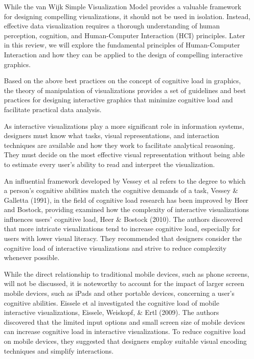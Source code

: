 \documentclass[print]{nuthesis}
\begin{document}
While the van Wijk Simple Visualization Model provides a valuable framework for designing compelling visualizations, it should not be used in isolation.
Instead, effective data visualization requires a thorough understanding of human perception, cognition, and Human-Computer Interaction (HCI) principles.
Later in this review, we will explore the fundamental principles of Human-Computer Interaction and how they can be applied to the design of compelling interactive graphics.

Based on the above best practices on the concept of cognitive load in graphics, the theory of manipulation of visualizations provides a set of guidelines and best practices for designing interactive graphics that minimize cognitive load and facilitate practical data analysis.

As interactive visualizations play a more significant role in information systems, designers must know what tasks, visual representations, and interaction techniques are available and how they work to facilitate analytical reasoning.
They must decide on the most effective visual representation without being able to estimate every user's ability to read and interpret the visualization.

An influential framework developed by Vessey et al refers to the degree to which a person's cognitive abilities match the cognitive demands of a task, Vessey \& Galletta (1991), in the field of cognitive load research has been improved by Heer and Bostock, providing examined how the complexity of interactive visualizations influences users' cognitive load, Heer \& Bostock (2010).
The authors discovered that more intricate visualizations tend to increase cognitive load, especially for users with lower visual literacy.
They recommended that designers consider the cognitive load of interactive visualizations and strive to reduce complexity whenever possible.

While the direct relationship to traditional mobile devices, such as phone screens, will not be discussed, it is noteworthy to account for the impact of larger screen mobile devices, such as iPads and other portable devices, concerning a user's cognitive abilities.
Eissele et al investigated the cognitive load of mobile interactive visualizations, Eissele, Weiskopf, \& Ertl (2009).
The authors discovered that the limited input options and small screen size of mobile devices can increase cognitive load in interactive visualizations.
To reduce cognitive load on mobile devices, they suggested that designers employ suitable visual encoding techniques and simplify interactions.
\end{document}
